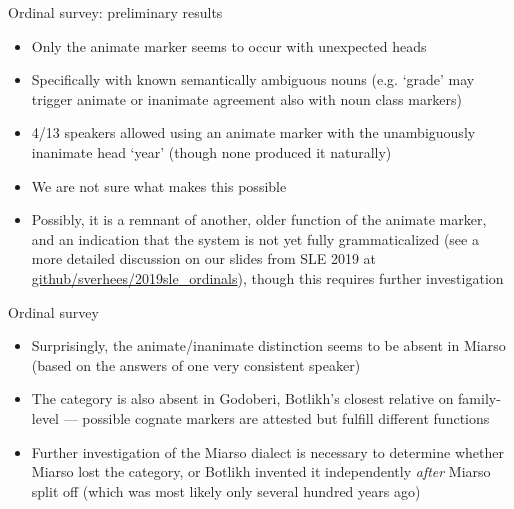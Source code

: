 \begin{frame}{Ordinal survey: preliminary results}
\begin{itemize}
    \item Only the animate marker seems to occur with unexpected heads
    \item Specifically with known semantically ambiguous nouns (e.g. `grade' may trigger animate or inanimate agreement also with noun class markers) %
    \item 4/13 speakers allowed using an animate marker with the unambiguously inanimate head `year' (though none produced it naturally)
    \item We are not sure what makes this possible
    \pause
    \item Possibly, it is a remnant of another, older function of the animate marker, and an indication that the system is not yet fully grammaticalized (see a more detailed discussion on our slides from SLE 2019 at \href{https://github.com/sverhees/2019sle\_ordinals}{github/sverhees/2019sle\_ordinals}), though this requires further investigation
\end{itemize}
\end{frame}
   
\begin{frame}{Ordinal survey}   

\begin{itemize}
    \item Surprisingly, the animate/inanimate distinction seems to be absent in Miarso (based on the answers of one very consistent speaker)
    \item The category is also absent in Godoberi, Botlikh's closest relative on family-level --- possible cognate markers are attested but fulfill different functions
    \item Further investigation of the Miarso dialect is necessary to determine whether Miarso lost the category, or Botlikh invented it independently \textit{after} Miarso split off (which was most likely only several hundred years ago)
\end{itemize}
\end{frame}

